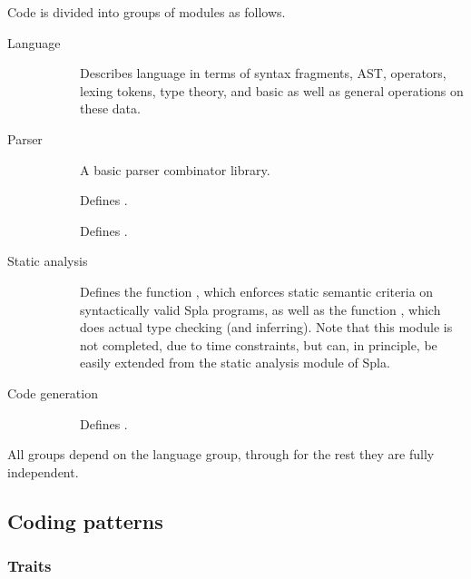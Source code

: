 \documentclass[english,10pt]{article} %
\theoremstyle{definitionstyle}
\theoremstyle{lemmastyle}
\begin{document}
Code is divided into groups of modules as follows.
\begin{description}
\item[Language]\hfill
  \begin{description}
  \item[] Describes language in terms of syntax fragments, AST, operators, lexing tokens, type theory, and basic as well as general operations on these data.
  \end{description}
\item[Parser]\hfill
  \begin{description}
  \item[] A basic parser combinator library.
  \item[] Defines .
  \item[] Defines .
  \end{description}
\item[Static analysis]\hfill
  \begin{description}
  \item[] Defines the function , which enforces static semantic criteria on syntactically valid Spla programs, as well as the function , which does actual type checking (and inferring). Note that this module is not completed, due to time constraints, but can, in principle, be easily extended from the static analysis module of Spla.
  \end{description}
\item[Code generation]\hfill
  \begin{description}
  \item[] Defines .
  \end{description}
\end{description}

All groups depend on the language group, through for the rest they are fully independent.

\subsection{Coding patterns}

\subsubsection{Traits}
\end{document}
